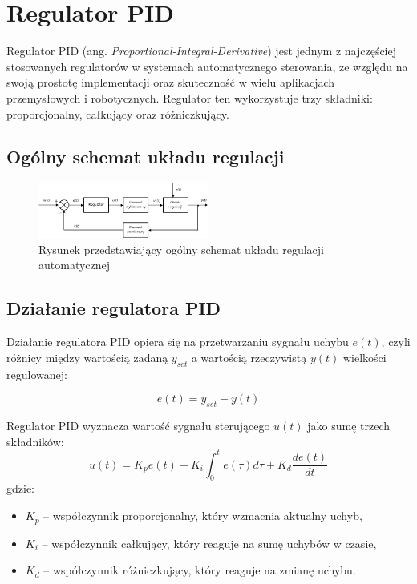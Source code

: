 \clearpage

\section{Regulator PID}

Regulator PID (ang. \textit{Proportional-Integral-Derivative}) jest jednym z najczęściej stosowanych regulatorów w systemach automatycznego sterowania, ze względu na swoją prostotę implementacji oraz skuteczność w wielu aplikacjach przemysłowych i robotycznych. Regulator ten wykorzystuje trzy składniki: proporcjonalny, całkujący oraz różniczkujący.

\subsection{Ogólny schemat układu regulacji}

\begin{figure}[h]
    \centering
    \includegraphics[width=0.5\textwidth]{./graf/regulacja1.png}
    \caption{Rysunek przedstawiający ogólny schemat układu regulacji automatycznej \cite{bib:wiki-regulacja}}
    \label{rys2:regulacja1}
\end{figure}

\subsection{Działanie regulatora PID}

Działanie regulatora PID opiera się na przetwarzaniu sygnału uchybu $e(t)$, czyli różnicy między wartością zadaną $y_{set}$ a wartością rzeczywistą $y(t)$ wielkości regulowanej:

\begin{equation}
e(t) = y_{set} - y(t)
\end{equation}

Regulator PID wyznacza wartość sygnału sterującego $u(t)$ jako sumę trzech składników:
\begin{equation}
u(t) = K_p e(t) + K_i \int_{0}^{t} e(\tau) d\tau + K_d \frac{de(t)}{dt}
\end{equation}
gdzie:
\begin{itemize}
    \item $K_p$ – współczynnik proporcjonalny, który wzmacnia aktualny uchyb,
    \item $K_i$ – współczynnik całkujący, który reaguje na sumę uchybów w czasie,
    \item $K_d$ – współczynnik różniczkujący, który reaguje na zmianę uchybu.
\end{itemize}

